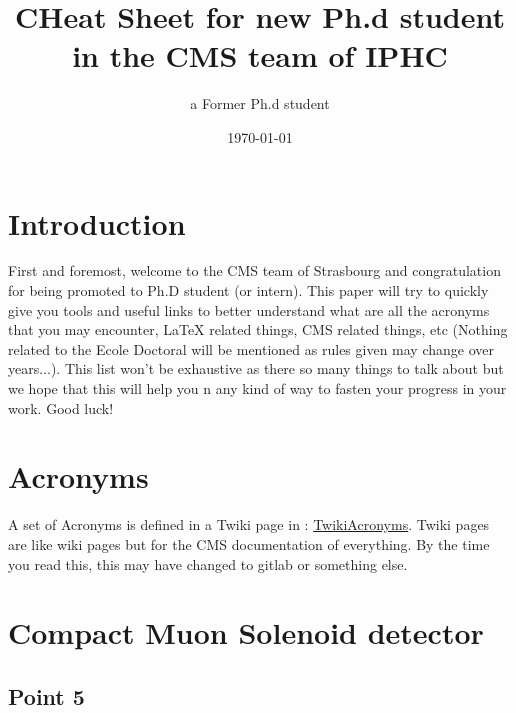 \documentclass[reprint, a4paper, nofootinbib, amsmath, amssymb, aps]{revtex4-1}
\begin{document}
\title{CHeat Sheet for new Ph.d student in the CMS team of IPHC}

\author{a Former Ph.d student}

\date{\today}

\maketitle

\section{Introduction}

First and foremost, welcome to the CMS team of Strasbourg and congratulation for being promoted to Ph.D student (or intern). This paper will try to quickly give you tools and useful links to better understand what are all the acronyms that you may encounter, LaTeX related things, CMS related things, etc (Nothing related to the Ecole Doctoral will be mentioned as rules given may change over years...). This list won't be exhaustive as there so many things to talk about but we hope that this will help you n any kind of way to fasten your progress in your work. Good luck!  

\section{Acronyms}
    A set of Acronyms is defined in a Twiki page in : \href{https://twiki.cern.ch/twiki/bin/view/CMSPublic/WorkBookGlossary}{TwikiAcronyms}. Twiki pages are like wiki pages but for the CMS documentation of everything. By the time you read this, this may have changed to gitlab or something else.
\section{Compact Muon Solenoid detector }
    
    \subsection{Point 5}
\end{document}
